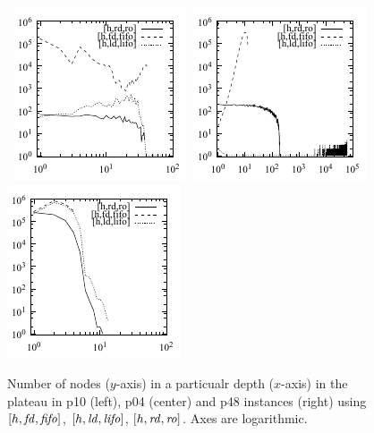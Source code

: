 \begin{figure}[tb]
 \centering {}
 \hbox{
 \includegraphics{tables/aaai16-log-rd/aaai16prelim3/depth-histogram-openstacks-opt11-strips-p10.pdf}
 \includegraphics{tables/aaai16-log-rd/2zerocost/depth-histogram-woodworking-cut-p04.pdf}
 \includegraphics{tables/aaai16-log-rd/2zerocost/depth-histogram-psr-small-open-p48.pdf}}
 \caption{Number of nodes ($y$-axis) in a particualr depth ($x$-axis) in the plateau in
  p10 (left),
  p04 (center) and
  p48 instances (right) using
 $[h,\mbox{\textit{fd}},\mbox{\textit{fifo}}]$, $[h,\mbox{\textit{ld}},\mbox{\textit{lifo}}]$, $[h,\mbox{\textit{rd}},\mbox{\textit{ro}}]$.
 Axes are logarithmic.
 }
 \label{depth-histogram}
\end{figure}


